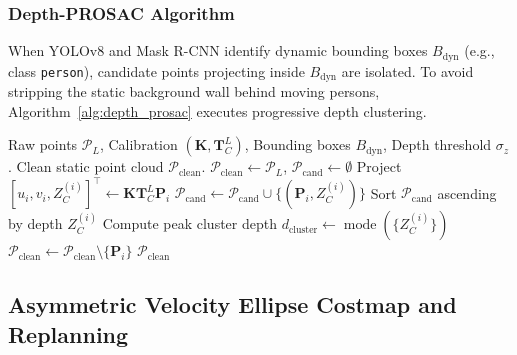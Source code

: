 \documentclass[journal]{IEEEtran}
\begin{document}
\subsubsection{Depth-PROSAC Algorithm}
When YOLOv8 and Mask R-CNN identify dynamic bounding boxes $B_{\text{dyn}}$ (e.g., class \texttt{person}), candidate points projecting inside $B_{\text{dyn}}$ are isolated. To avoid stripping the static background wall behind moving persons, Algorithm~\ref{alg:depth_prosac} executes progressive depth clustering.

\begin{algorithm}[!h]
\caption{Depth-PROSAC Dynamic Point Removal}
\label{alg:depth_prosac}
\begin{algorithmic}[1]
\REQUIRE Raw points $\mathcal{P}_L$, Calibration $(\mathbf{K}, \mathbf{T}_C^L)$, Bounding boxes $B_{\text{dyn}}$, Depth threshold $\sigma_z$.
\ENSURE Clean static point cloud $\mathcal{P}_{\text{clean}}$.
\STATE $\mathcal{P}_{\text{clean}} \leftarrow \mathcal{P}_L$, $\mathcal{P}_{\text{cand}} \leftarrow \emptyset$
    \STATE Project $[u_i, v_i, Z_C^{(i)}]^{\top} \leftarrow \mathbf{K} \mathbf{T}_C^L \mathbf{P}_i$
        \STATE $\mathcal{P}_{\text{cand}} \leftarrow \mathcal{P}_{\text{cand}} \cup \{(\mathbf{P}_i, Z_C^{(i)})\}$
    \ENDIF
\ENDFOR
\STATE Sort $\mathcal{P}_{\text{cand}}$ ascending by depth $Z_C^{(i)}$
\STATE Compute peak cluster depth $d_{\text{cluster}} \leftarrow \operatorname{mode}(\{Z_C^{(i)}\})$
        \STATE $\mathcal{P}_{\text{clean}} \leftarrow \mathcal{P}_{\text{clean}} \setminus \{\mathbf{P}_i\}$ 
    \ENDIF
\ENDFOR
\RETURN $\mathcal{P}_{\text{clean}}$
\end{algorithmic}
\end{algorithm}

\subsection{Asymmetric Velocity Ellipse Costmap and Replanning}
\end{document}
